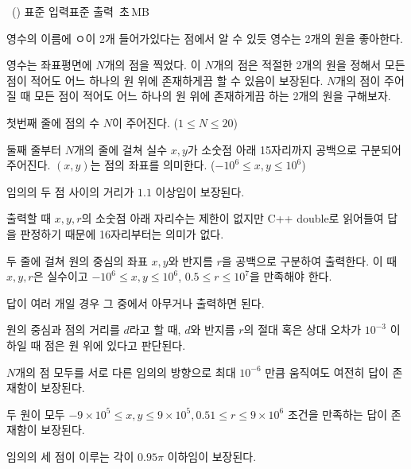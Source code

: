 \begin{problem}{\kcpcproboo\ (\kcpcprobooshort)}
    {표준 입력}{표준 출력}
    {\kcpcprobootime\,초}{\kcpcproboomemory\,MB}{}
    
    영수의 이름에 ㅇ이 2개 들어가있다는 점에서 알 수 있듯 영수는 2개의 원을 좋아한다.
    
    영수는 좌표평면에 $N$개의 점을 찍었다. 이 $N$개의 점은 적절한 2개의 원을 정해서 모든 점이 적어도 어느 하나의 원 위에 존재하게끔 할 수 있음이 보장된다. $N$개의 점이 주어질 때 모든 점이 적어도 어느 하나의 원 위에 존재하게끔 하는 2개의 원을 구해보자.
    
    \InputFile
    첫번째 줄에 점의 수 $N$이 주어진다. ($1 \le N \le 20$)
    
    둘째 줄부터 $N$개의 줄에 걸쳐 실수 $x, y$가 소숫점 아래 15자리까지 공백으로 구분되어 주어진다. $(x,y)$는 점의 좌표를 의미한다. ($ -10^6 \le x, y \le 10^6$)
    
    임의의 두 점 사이의 거리가 $1.1$ 이상임이 보장된다.
    
    출력할 때 $x, y, r$의 소숫점 아래 자리수는 제한이 없지만 C++ double로 읽어들여 답을 판정하기 때문에 16자리부터는 의미가 없다.
    
    \OutputFile
    두 줄에 걸쳐 원의 중심의 좌표 $x, y$와 반지름 $r$을 공백으로 구분하여 출력한다. 이 때 $x, y, r$은 실수이고 $-10^6 \le x, y \le 10^6$, $ 0.5 \le r \le 10^7$을 만족해야 한다.
    
    답이 여러 개일 경우 그 중에서 아무거나 출력하면 된다.
   
    \Examples
    
    \begin{example}
    \end{example}
    
    \Notes
    원의 중심과 점의 거리를 $d$라고 할 때, $d$와 반지름 $r$의 절대 혹은 상대 오차가 $10^{-3}$ 이하일 때 점은 원 위에 있다고 판단된다.
    
    $N$개의 점 모두를 서로 다른 임의의 방향으로 최대 $10^{-6}$ 만큼 움직여도 여전히 답이 존재함이 보장된다.
    
    두 원이 모두 $-9 \times 10^5 \le x, y \le 9 \times 10^5, 0.51 \le r \le 9 \times 10^6$ 조건을 만족하는 답이 존재함이 보장된다.
    
    임의의 세 점이 이루는 각이 $0.95\pi$ 이하임이 보장된다.
    
\end{problem}

